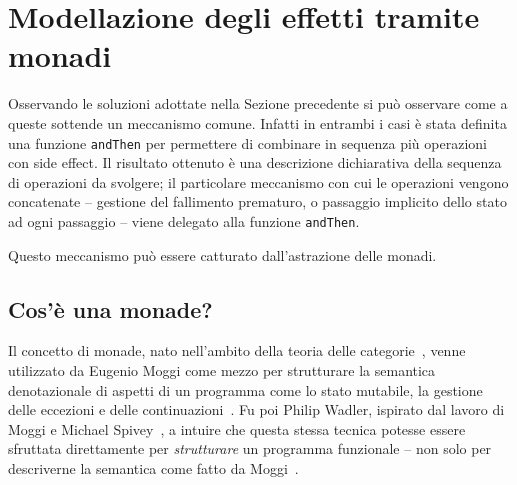 \section{Modellazione degli effetti tramite monadi}
Osservando le soluzioni adottate nella Sezione precedente si può osservare come a queste sottende un meccanismo comune. Infatti in entrambi i casi è stata definita una funzione \lstinline{andThen} per permettere di combinare in sequenza più operazioni con side effect. Il risultato ottenuto è una descrizione dichiarativa della sequenza di operazioni da svolgere; il particolare meccanismo con cui le operazioni vengono concatenate -- gestione del fallimento prematuro, o passaggio implicito dello stato ad ogni passaggio -- viene delegato alla funzione \lstinline{andThen}.

Questo meccanismo può essere catturato dall'astrazione delle monadi.

\subsection{Cos'è una monade?}
\label{cos-e-una-monade}
Il concetto di monade, nato nell'ambito della teoria delle categorie~\cite{cit:categories-for-the-working-mathematician}, venne utilizzato da Eugenio Moggi come mezzo per strutturare la semantica denotazionale di aspetti di un programma come lo stato mutabile, la gestione delle eccezioni e delle continuazioni~\cite{cit:an-abstract-view-of-programming-languages}.
Fu poi Philip Wadler, ispirato dal lavoro di Moggi e Michael Spivey~\cite{cit:a-functional-theory-of-exceptions}, a intuire che questa stessa tecnica potesse essere sfruttata direttamente per \emph{strutturare} un programma funzionale -- non solo per descriverne la semantica come fatto da Moggi~\cite{cit:comprehending-monads,cit:the-essence-of-functional-programming}.

